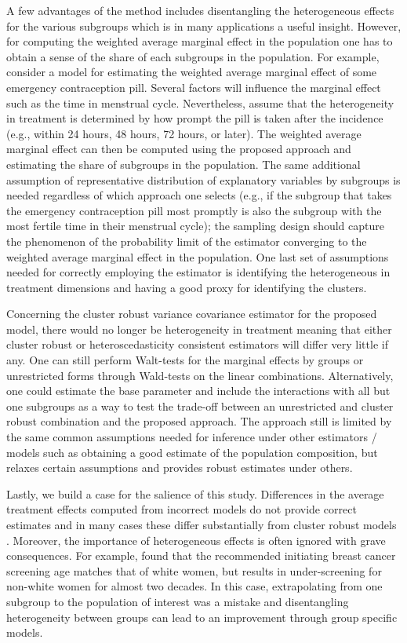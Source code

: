 \documentclass{jbsc}
\begin{document}
A few advantages of the method includes disentangling the heterogeneous effects for the various subgroups which is in many applications a useful insight. However, for computing the weighted average marginal effect in the population one has to obtain a sense of the share of each subgroups in the population. For example, consider a model for estimating the weighted average marginal effect of some emergency contraception pill. Several factors will influence the marginal effect such as the time in menstrual cycle. Nevertheless, assume that the heterogeneity in treatment is determined by how prompt the pill is taken after the incidence (e.g., within 24 hours, 48 hours, 72 hours, or later). The weighted average marginal effect can then be computed using the proposed approach and estimating the share of subgroups in the population. The same additional assumption of representative distribution of explanatory variables by subgroups is needed regardless of which approach one selects (e.g., if the subgroup that takes the emergency contraception pill most promptly is also the subgroup with the most fertile time in their menstrual cycle); the sampling design should capture the phenomenon of the probability limit of the estimator converging to the weighted average marginal effect in the population. One last set of assumptions needed for correctly employing the estimator is identifying the heterogeneous in treatment dimensions and having a good proxy for identifying the clusters.

Concerning the cluster robust variance covariance estimator for the proposed model, there would no longer be heterogeneity in treatment meaning that either cluster robust or heteroscedasticity consistent estimators will differ very little if any. One can still perform Walt-tests for the marginal effects by groups or unrestricted forms through Wald-tests on the linear combinations. Alternatively, one could estimate the base parameter and include the interactions with all but one subgroups as a way to test the trade-off between an unrestricted and cluster robust combination and the proposed approach. The approach still is limited by the same common assumptions needed for inference under other estimators / models such as obtaining a good estimate of the population composition, but relaxes certain assumptions and provides robust estimates under others.

Lastly, we build a case for the salience of this study. Differences in the average treatment effects computed from incorrect models do not provide correct estimates and in many cases these differ substantially from cluster robust models \citep{Gibbons_SúarezSerrato_Urbancic_2018}. Moreover, the importance of heterogeneous effects is often ignored with grave consequences. For example, \citet{Stapleton_Oseni_Bababekov_Hung_Chang_2018} found that the recommended initiating breast cancer screening age matches that of white women, but results in under-screening for non-white women for almost two decades. In this case, extrapolating from one subgroup to the population of interest was a mistake and disentangling heterogeneity between groups can lead to an improvement through group specific models.
\end{document}
